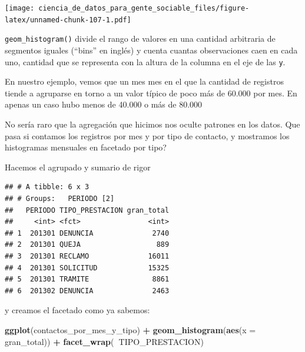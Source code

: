 \documentclass[spanish,]{book}
\newenvironment{Shaded}{\begin{snugshade}}{\end{snugshade}}
\newcommand{\DataTypeTok}[1]{\textcolor[rgb]{0.13,0.29,0.53}{#1}}
\newcommand{\KeywordTok}[1]{\textcolor[rgb]{0.13,0.29,0.53}{\textbf{#1}}}
\newcommand{\NormalTok}[1]{#1}
\newcommand{\OperatorTok}[1]{\textcolor[rgb]{0.81,0.36,0.00}{\textbf{#1}}}
\newcommand{\StringTok}[1]{\textcolor[rgb]{0.31,0.60,0.02}{#1}}
\begin{document}
\texttt{[image: ciencia\_de\_datos\_para\_gente\_sociable\_files/figure-latex/unnamed-chunk-107-1.pdf]}

\texttt{geom\_histogram()} divide el rango de valores en una cantidad arbitraria de segmentos iguales (``bins'' en inglés) y cuenta cuantas observaciones caen en cada uno, cantidad que se representa con la altura de la columna en el eje de las \texttt{y}.

En nuestro ejemplo, vemos que un mes mes en el que la cantidad de registros tiende a agruparse en torno a un valor típico de poco más de 60.000 por mes. En apenas un caso hubo menos de 40.000 o más de 80.000

No sería raro que la agregación que hicimos nos oculte patrones en los datos. Que pasa si contamos los registros por mes y por tipo de contacto, y mostramos los histogramas mensuales en facetado por tipo?

Hacemos el agrupado y sumario de rigor

\begin{Shaded}
\end{Shaded}

\begin{verbatim}
## # A tibble: 6 x 3
## # Groups:   PERIODO [2]
##   PERIODO TIPO_PRESTACION gran_total
##     <int> <fct>                <int>
## 1  201301 DENUNCIA              2740
## 2  201301 QUEJA                  889
## 3  201301 RECLAMO              16011
## 4  201301 SOLICITUD            15325
## 5  201301 TRAMITE               8861
## 6  201302 DENUNCIA              2463
\end{verbatim}

y creamos el facetado como ya sabemos:

\begin{Shaded}
\begin{Highlighting}[]
\KeywordTok{ggplot}\NormalTok{(contactos_por_mes_y_tipo) }\OperatorTok{+}\StringTok{ }
\StringTok{    }\KeywordTok{geom_histogram}\NormalTok{(}\KeywordTok{aes}\NormalTok{(}\DataTypeTok{x =}\NormalTok{ gran_total)) }\OperatorTok{+}
\StringTok{    }\KeywordTok{facet_wrap}\NormalTok{(}\OperatorTok{~}\NormalTok{TIPO_PRESTACION)}
\end{Highlighting}
\end{Shaded}
\end{document}
